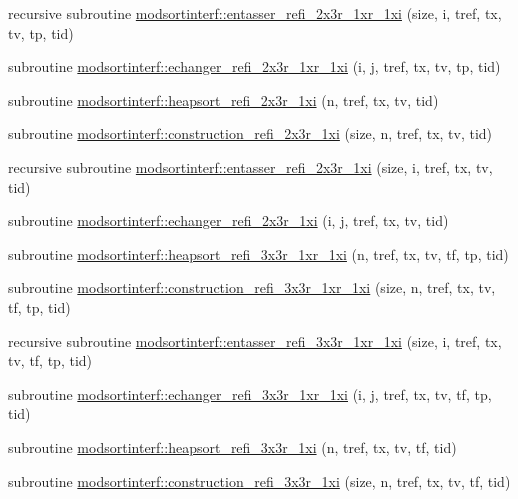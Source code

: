\begin{DoxyCompactItemize}
\item 
recursive subroutine \hyperlink{namespacemodsortinterf_a67991c6305dfcc00beccf5b59b56a27a}{modsortinterf\+::entasser\+\_\+refi\+\_\+2x3r\+\_\+1xr\+\_\+1xi} (size, i, tref, tx, tv, tp, tid)
\item 
subroutine \hyperlink{namespacemodsortinterf_af56b411a674e066df5be4a24ef336be3}{modsortinterf\+::echanger\+\_\+refi\+\_\+2x3r\+\_\+1xr\+\_\+1xi} (i, j, tref, tx, tv, tp, tid)
\item 
subroutine \hyperlink{namespacemodsortinterf_ac2dc7168d6a963411656a8c43dfc6cd8}{modsortinterf\+::heapsort\+\_\+refi\+\_\+2x3r\+\_\+1xi} (n, tref, tx, tv, tid)
\item 
subroutine \hyperlink{namespacemodsortinterf_add759648e814227c7eaab60be1136bfd}{modsortinterf\+::construction\+\_\+refi\+\_\+2x3r\+\_\+1xi} (size, n, tref, tx, tv, tid)
\item 
recursive subroutine \hyperlink{namespacemodsortinterf_aaa736057b949fa0ab7caf3a9f2939e3c}{modsortinterf\+::entasser\+\_\+refi\+\_\+2x3r\+\_\+1xi} (size, i, tref, tx, tv, tid)
\item 
subroutine \hyperlink{namespacemodsortinterf_a2f6d8ec8dae8388f6359afd4e270cec7}{modsortinterf\+::echanger\+\_\+refi\+\_\+2x3r\+\_\+1xi} (i, j, tref, tx, tv, tid)
\item 
subroutine \hyperlink{namespacemodsortinterf_a8cf65af17497fd22fe3d47f5d7d23094}{modsortinterf\+::heapsort\+\_\+refi\+\_\+3x3r\+\_\+1xr\+\_\+1xi} (n, tref, tx, tv, tf, tp, tid)
\item 
subroutine \hyperlink{namespacemodsortinterf_a3130a7808f6f62b868b3afced894269b}{modsortinterf\+::construction\+\_\+refi\+\_\+3x3r\+\_\+1xr\+\_\+1xi} (size, n, tref, tx, tv, tf, tp, tid)
\item 
recursive subroutine \hyperlink{namespacemodsortinterf_a81c24af2921a4ced0ef5df8a45652e14}{modsortinterf\+::entasser\+\_\+refi\+\_\+3x3r\+\_\+1xr\+\_\+1xi} (size, i, tref, tx, tv, tf, tp, tid)
\item 
subroutine \hyperlink{namespacemodsortinterf_aab7bd2f1fab343a2a5da2652052035a2}{modsortinterf\+::echanger\+\_\+refi\+\_\+3x3r\+\_\+1xr\+\_\+1xi} (i, j, tref, tx, tv, tf, tp, tid)
\item 
subroutine \hyperlink{namespacemodsortinterf_a202fac9db69240603932abfc99728f45}{modsortinterf\+::heapsort\+\_\+refi\+\_\+3x3r\+\_\+1xi} (n, tref, tx, tv, tf, tid)
\item 
subroutine \hyperlink{namespacemodsortinterf_a8a1da2bee36039921d07d76d50821fe5}{modsortinterf\+::construction\+\_\+refi\+\_\+3x3r\+\_\+1xi} (size, n, tref, tx, tv, tf, tid)

\end{DoxyCompactItemize}
